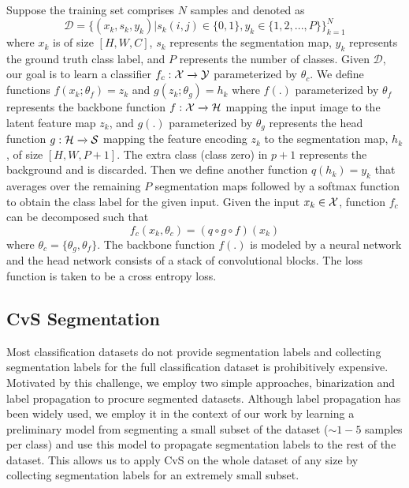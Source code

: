 \documentclass[conference]{IEEEtran}
\begin{document}
Suppose the training set comprises $N$ samples and denoted as 
\[\mathcal{D} = \big\{(x_k, s_k, y_k)|s_{k}(i,j)\in\{0,1\}, y_k \in\{1,2,...,P\} \big\}^{N}_{k=1}\]
where $x_k$ is of size $[H, W, C]$, $s_{k}$ represents the segmentation map, $y_k$ represents the ground truth class label, and $P$ represents the number of classes. Given $\mathcal{D}$, our goal is to learn a classifier $f_c:\cal{X}\xrightarrow{}\cal{Y}$ parameterized by $\theta_c$. We define functions $f(x_k;\theta_f)=z_k$ and $g(z_k;\theta_g)=h_k$ 
%
%
%
where $f(.)$ parameterized by $\theta_f$ represents the backbone function $f:\cal{X}\xrightarrow{}\cal{H}$ mapping the input image to the latent feature map $z_k$, and $g(.)$ parameterized by $\theta_g$ represents the head function $g:\cal{H}\xrightarrow{}\cal{S}$ mapping the feature encoding $z_k$ to the segmentation map, $h_k$, of size $[H, W, P+1]$. The extra class (class zero) in $p+1$ represents the background and is discarded. Then we define another function $q(h_k)=y_k$ that averages over the remaining $P$ segmentation maps followed by a softmax function to obtain the class label for the given input. Given the input $x_k \in \cal{X}$, function $f_c$ can be decomposed such that 
%
\begin{equation}\label{eq:decoder_clf}
f_c(x_k, \theta_c)=(q\circ g\circ f)(x_k)
\end{equation}
%
where $\theta_c=\{\theta_g, \theta_f\}$. The backbone function $f(.)$ is modeled by a neural network and the head network consists of a stack of convolutional blocks. The loss function is taken to be a cross entropy loss.


\subsection{CvS Segmentation}
Most classification datasets do not provide segmentation labels and collecting segmentation labels for the full classification dataset is prohibitively expensive. Motivated by this challenge, we employ two simple approaches, binarization and label propagation to procure segmented datasets. Although label propagation has been widely used, we employ it in the context of our work by learning a preliminary model from segmenting a small subset of the dataset ($\sim1-5$ samples per class) and use this model to propagate segmentation labels to the rest of the dataset. This allows us to apply CvS on the whole dataset of any size by collecting segmentation labels for an extremely small subset. 
\end{document}

